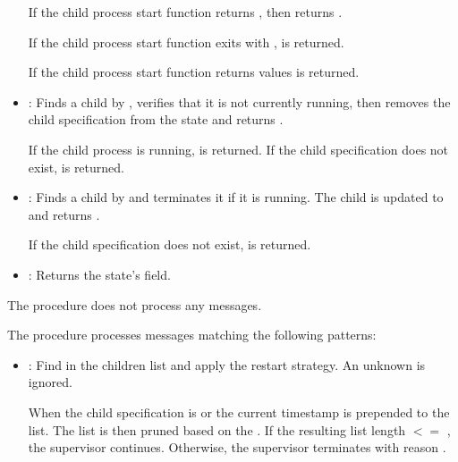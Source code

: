 \begin{itemize}
    If the child process start function returns , then  returns
    .

    If the child process start function exits with ,
     is returned.

    If the child process start function returns  values
     is returned.

  \item{}: Finds a child by
    , verifies that it is not currently running, then
    removes the child specification from the state and returns
    .

    If the child process is running,  is
    returned.  If the child specification does not exist,
     is returned.

  \item{}: Finds a child by
     and terminates it if it is running. The child 
    is updated to  and returns .

    If the child specification does not exist,  is returned.

  \item{}: Returns the state's 
    field.
\end{itemize}

 The  procedure
does not process any messages.

 The  procedure
processes messages matching the following patterns:

\antipar
\begin{itemize}
  \item{}: Find  in
    the children list and apply the restart strategy. An unknown
     is ignored.

    When the child specification  is
     or  the current timestamp is
    prepended to the  list. The list is then pruned
    based on the . If the resulting list length $<=$
    , the supervisor continues. Otherwise, the
    supervisor terminates with reason .
\end{itemize}

